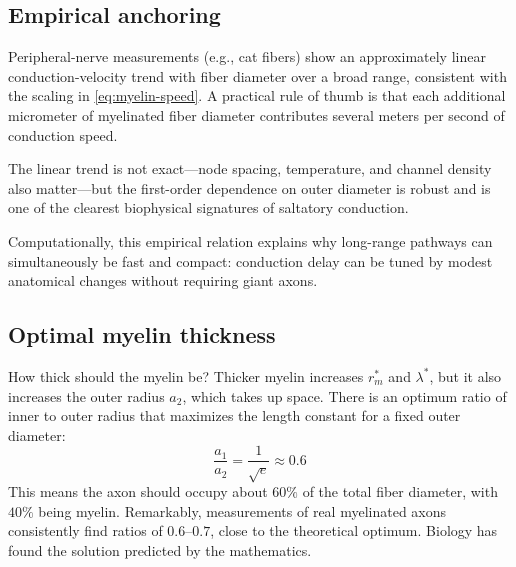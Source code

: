 \subsection{Empirical anchoring}

Peripheral-nerve measurements (e.g., cat fibers) show an approximately linear conduction-velocity trend with fiber diameter over a broad range, consistent with the scaling in \cref{eq:myelin-speed}. A practical rule of thumb is that each additional micrometer of myelinated fiber diameter contributes several meters per second of conduction speed.

The linear trend is not exact---node spacing, temperature, and channel density also matter---but the first-order dependence on outer diameter is robust and is one of the clearest biophysical signatures of saltatory conduction.

Computationally, this empirical relation explains why long-range pathways can simultaneously be fast and compact: conduction delay can be tuned by modest anatomical changes without requiring giant axons.

\subsection{Optimal myelin thickness}

How thick should the myelin be? Thicker myelin increases $r_m^*$ and $\lambda^*$, but it also increases the outer radius $a_2$, which takes up space. There is an optimum ratio of inner to outer radius that maximizes the length constant for a fixed outer diameter:
%
\begin{equation}
  \frac{a_1}{a_2} = \frac{1}{\sqrt{e}} \approx 0.6
  \label{eq:optimal-ratio}
\end{equation}
%
This means the axon should occupy about $60\%$ of the total fiber diameter, with $40\%$ being myelin. Remarkably, measurements of real myelinated axons consistently find ratios of $0.6$--$0.7$, close to the theoretical optimum. Biology has found the solution predicted by the mathematics.



